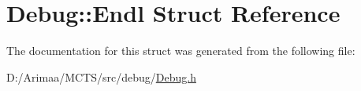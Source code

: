 \hypertarget{struct_debug_1_1_endl}{\section{Debug\+:\+:Endl Struct Reference}
\label{struct_debug_1_1_endl}
}


The documentation for this struct was generated from the following file\+:\begin{DoxyCompactItemize}
\item 
D\+:/\+Arimaa/\+M\+C\+T\+S/src/debug/\hyperlink{_debug_8h}{Debug.\+h}\end{DoxyCompactItemize}
